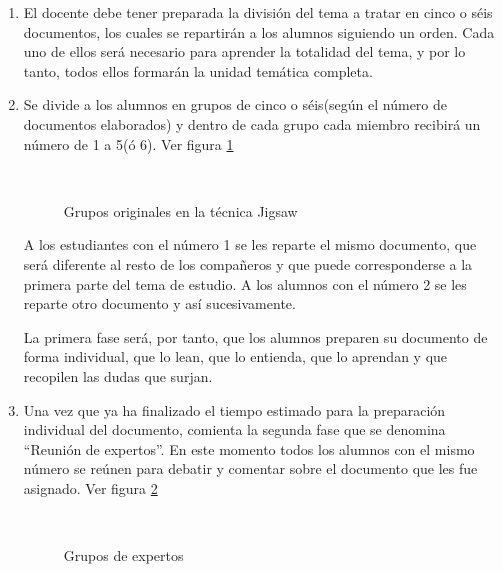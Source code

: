 \begin{enumerate}
  \item El docente debe tener preparada la división del tema a tratar en cinco o séis documentos, los cuales se repartirán a los alumnos siguiendo un orden. Cada uno de ellos será necesario para aprender la totalidad del tema, y por lo tanto, todos ellos formarán la unidad temática completa.
  \item Se divide a los alumnos en grupos de cinco o séis(según el número de documentos elaborados) y dentro de cada grupo cada miembro recibirá un número de 1 a 5(ó 6). Ver figura \ref{fig:jigsaw01}

\begin{figure}[h]
  \centering
  \\
  \caption{Grupos originales en la técnica Jigsaw}\label{fig:jigsaw01}
\end{figure}

A los estudiantes con el número 1 se les reparte el mismo documento, que será diferente al resto de los compañeros y que puede corresponderse a la primera parte del tema de estudio. A los alumnos con el número 2 se les reparte otro documento y así sucesivamente.

La primera fase será, por tanto, que los alumnos preparen su documento de forma individual, que lo lean, que lo entienda, que lo aprendan y que recopilen las dudas que surjan.

  \item Una vez que ya ha finalizado el tiempo estimado para la preparación individual del documento, comienta la segunda fase que se denomina ``Reunión de expertos''. En este momento todos los alumnos con el mismo número se reúnen para debatir y comentar sobre el documento que les fue asignado. Ver figura \ref{fig:jigsaw02}

  \begin{figure}[h]
  \centering
  \\
  \caption{Grupos de expertos}\label{fig:jigsaw02}
\end{figure}


\end{enumerate}
